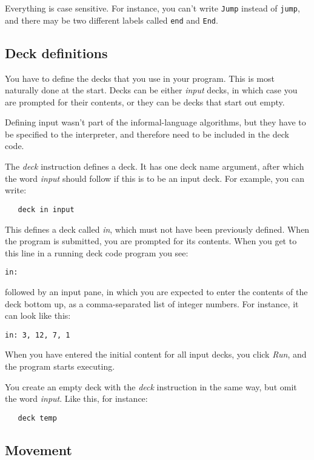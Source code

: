 \documentclass[a4paper,twoside]{tufte-handout}
\begin{document}
Everything is case sensitive. For instance, you can't write
\lstinline!Jump! instead of \lstinline!jump!, and there may be two
different labels called \lstinline!end! and \lstinline!End!.

\subsection{Deck definitions}

You have to define the decks that you use in your program. This is
most naturally done at the start. Decks can be either \emph{input}
decks, in which case you are prompted for their contents, or they can
be decks that start out empty.

Defining input wasn't part of the informal-language algorithms, but
they have to be specified to the interpreter, and therefore need to be
included in the deck code.

The \emph{deck} instruction defines a deck. It has one deck name
argument, after which the word \emph{input} should follow if this is
to be an input deck. For example, you can write:
\begin{lstlisting}
   deck in input
\end{lstlisting}

This defines a deck called \emph{in}, which must not have been
previously defined. When the program is submitted, you are prompted
for its contents. When you get to
this line in a running deck code program you see:
\begin{lstlisting}
in: 
\end{lstlisting}
followed by an input pane, in which you are expected to enter the contents of the deck bottom up, as a
comma-separated list of integer numbers. For instance, it can look
like this:
\begin{lstlisting}
in: 3, 12, 7, 1
\end{lstlisting}
When you have entered the initial content for all input decks, you
click \emph{Run}, and the program starts executing.

You create an empty deck with the \emph{deck} instruction in the same
way, but omit the word \emph{input}. Like this, for instance:
\begin{lstlisting}
   deck temp
\end{lstlisting}

\subsection{Movement}\label{sec-move}
\end{document}
